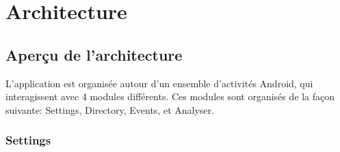 \chapter{Architecture}
\section{Aperçu de l'architecture}

\begin{figure}[h]
  \label{fig:architecture}
  \center
  \setlength\fboxsep{5pt}
  \setlength\fboxrule{0.5pt}
\end{figure}

L'application est organisée autour d'un ensemble d'activités Android, qui interagissent avec 4 modules différents. Ces modules sont organisés de la façon suivante: Settings, Directory, Events, et Analyser.

\newpage
\subsection{Settings}

\begin{figure}[h!]
  \label{fig:preferences_mod}
  \center
  \setlength\fboxsep{5pt}
  \setlength\fboxrule{0.5pt}
\end{figure}

